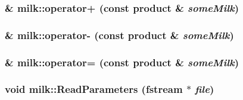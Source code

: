 \label{classmilk_aee1f5edbd82a3877995fde62a2c56abb}
\hypertarget{classmilk_aa1c2c44df35bc4ce7f82e448a23acf5f}{
\subsubsection[{operator+}]{ \& milk::operator+ (const {\bf product} \& {\em someMilk})}}
\label{classmilk_aa1c2c44df35bc4ce7f82e448a23acf5f}
\hypertarget{classmilk_a904640cf0fbcf990815d26f6c9453edb}{
\subsubsection[{operator-\/}]{ \& milk::operator-\/ (const {\bf product} \& {\em someMilk})}}
\label{classmilk_a904640cf0fbcf990815d26f6c9453edb}
\hypertarget{classmilk_a91f8abdababf02b7204b5bffcbbf2557}{
\subsubsection[{operator=}]{ \& milk::operator= (const {\bf product} \& {\em someMilk})}}
\label{classmilk_a91f8abdababf02b7204b5bffcbbf2557}
\hypertarget{classmilk_afad44ced6ab580a41fcc582cb83b87dd}{
\subsubsection[{ReadParameters}]{\setlength{\rightskip}{0pt plus 5cm}void milk::ReadParameters (fstream $\ast$ {\em file})}}
\label{classmilk_afad44ced6ab580a41fcc582cb83b87dd}


